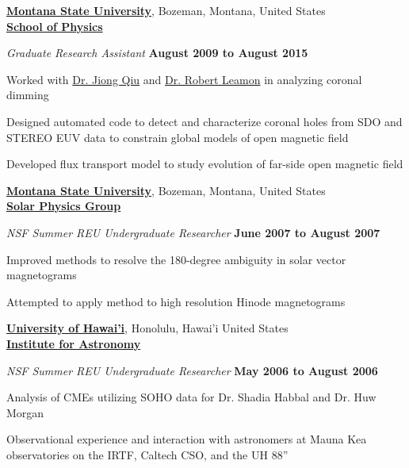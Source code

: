 \documentclass[10pt]{article}
\newenvironment{outerlist}[1][\enskip\textbullet]%
        {\begin{enumerate}[#1]}{\end{enumerate}%
         \vspace{-.6\baselineskip}}
\newenvironment{innerlist}[1][\enskip\textbullet]%
        {\begin{compactenum}[#1]}{\end{compactenum}}
\begin{document}
\href{http://www.montana.edu}{\textbf{Montana State University}}, 
Bozeman, Montana, United States\\
\href{http://www.physics.montana.edu}{\textbf{School of Physics}}
\begin{outerlist}
\item[] \textit{Graduate Research Assistant}%
        \hfill \textbf{August 2009 to August 2015}
\begin{innerlist}
  \item Worked with \href{http://solar.physics.montana.edu/qiuj/}{Dr. Jiong Qiu} and \href{http://solar.physics.montana.edu/leamon/}{Dr. Robert Leamon} in analyzing coronal dimming
  \item Designed automated code to detect and characterize coronal holes from SDO and STEREO EUV data to constrain global models of open magnetic field
  \item Developed flux transport model to study evolution of far-side open magnetic field
  \\
\end{innerlist}

\end{outerlist}

\href{http://solar.physics.montana.edu/}{\textbf{Montana State University}}, 
Bozeman, Montana, United States\\
\href{http://solar.physics.montana.edu/}{\textbf{Solar Physics Group}}
\begin{outerlist}
\item[] \textit{NSF Summer REU Undergraduate Researcher}%
        \hfill \textbf{June 2007 to August 2007}
\begin{innerlist}

  \item Improved methods to resolve the 180-degree ambiguity in solar vector \mbox{magnetograms}
  \item Attempted to apply method to high resolution Hinode magnetograms
  \\
\end{innerlist}

\end{outerlist}


\href{http://www.ifa.hawaii.edu/}{\textbf{University of Hawai'i}}, 
Honolulu, Hawai'i United States\\
\href{http://www.ifa.hawaii.edu/}{\textbf{Institute for Astronomy}}
\begin{outerlist}
\item[] \textit{NSF Summer REU Undergraduate Researcher}%
        \hfill \textbf{May 2006 to August 2006}
\begin{innerlist}
  \item Analysis of CMEs utilizing SOHO data for Dr. Shadia Habbal and Dr. Huw Morgan
  \item Observational experience and interaction with astronomers at Mauna Kea \mbox{observatories} on the IRTF, Caltech CSO, and the UH 88'' \\
\end{innerlist}

\end{outerlist}
\end{document}
